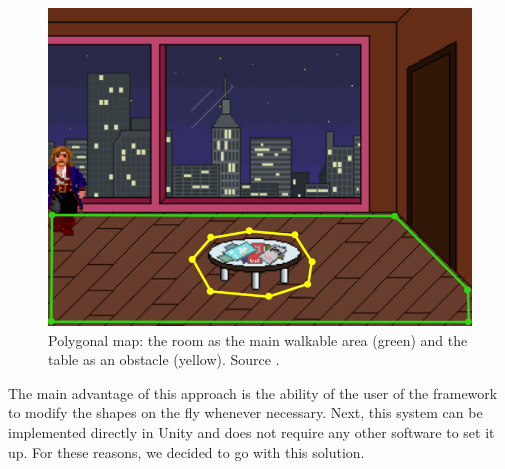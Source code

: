 \begin{figure}[H]
\centering
\includegraphics[width=.7\linewidth]{img/WS-polygons4.png}
\caption{Polygonal map: the room as the main walkable area (green) and the table as an obstacle (yellow). Source \cite{Uurloon1}.}
\label{fig:WS:Poly}
\end{figure}

The main advantage of this approach is the ability of the user of the framework to modify the shapes on the fly whenever necessary. Next, this system can be implemented directly in Unity and does not require any other software to set it up. For these reasons, we decided to go with this solution.

